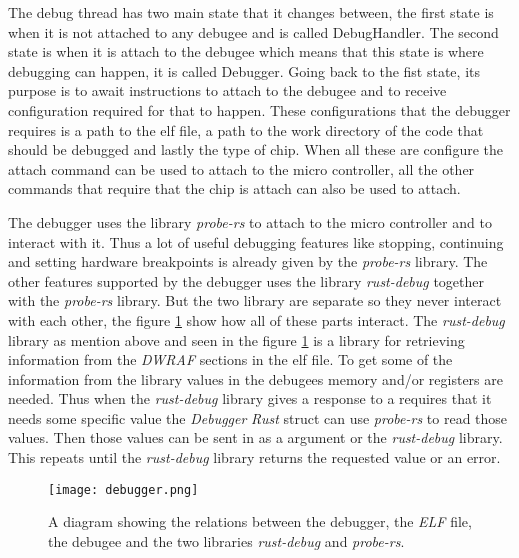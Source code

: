 
The debug thread has two main state that it changes between, the first state is when it is not attached to any \gls{debugee} and is called DebugHandler.
The second state is when it is attach to the \gls{debugee} which means that this state is where debugging can happen, it is called Debugger.
Going back to the fist state, its purpose is to await instructions to attach to the \gls{debugee} and to receive configuration required for that to happen.
These configurations that the debugger requires is a path to the elf file, a path to the work directory of the code that should be debugged and lastly the type of chip.
When all these are configure the attach command can be used to attach to the micro controller, all the other commands that require that the chip is attach can also be used to attach.


The debugger uses the library \emph{probe-rs} \cite{probe} to attach to the micro controller and to interact with it.
Thus a lot of useful debugging features like stopping, continuing and setting hardware breakpoints is already given by the \emph{probe-rs} library.
The other features supported by the debugger uses the library \emph{rust-debug} together with the \emph{probe-rs} library.
But the two library are separate so they never interact with each other, the figure \ref{fig:debugger} show how all of these parts interact.
The \emph{rust-debug} library as mention above and seen in the figure \ref{fig:debugger} is a library for retrieving information from the \emph{DWRAF} sections in the \gls{elf} file.
To get some of the information from the library values in the \glspl{debugee} memory and/or registers are needed.
Thus when the \emph{rust-debug} library gives a response to a requires that it needs some specific value the \emph{Debugger} \emph{Rust} struct can use \emph{probe-rs} to read those values.
Then those values can be sent in as a argument or the \emph{rust-debug} library.
This repeats until the \emph{rust-debug} library returns the requested value or an error.


\begin{figure}[h]
	\centering
	\texttt{[image: debugger.png]}
	\caption{A diagram showing the relations between the debugger, the \emph{ELF} file, the \gls{debugee} and the two libraries \emph{rust-debug} and \emph{probe-rs}.}
	\label{fig:debugger}
\end{figure}


